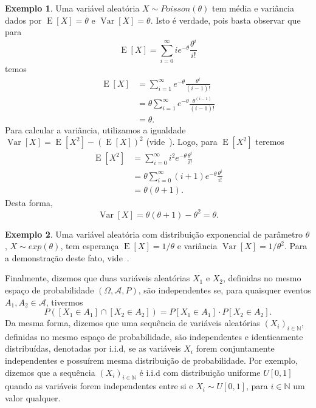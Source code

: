 \documentclass[twoside,openright,titlepage,numbers=noenddot,headinclude,  lineheaders footinclude=true,cleardoublepage=empty,
                                BCOR=5mm,paper=a4,fontsize=12pt ]{scrbook}
\theoremstyle{definition}
\newtheorem{exmp}{Exemplo}[section]
\DeclareMathOperator{\E}{E}
\DeclareMathOperator{\Var}{Var}
\begin{document}
\begin{exmp}
Uma variável aleatória $X \sim Poisson(\theta)$ tem média e variância dados por
$\E[X] = \theta$  e $\Var[X] = \theta$. Isto é verdade, pois
basta observar que para
\[
\E[X] = \sum_{i=0}^{\infty} i e^{-\theta} \frac{\theta^i}{i!}
\]
temos 
\begin{align*}
\E[X] &= \sum_{i=1}^{\infty} e^{-\theta} \frac{\theta^i}{(i-1)!}\\
     &= \theta \sum_{i=1}^{\infty} e^{-\theta} \frac{\theta^{(i-1)}}{(i-1)!}\\
	 &= \theta.
\end{align*}
Para calcular a variância, utilizamos a igualdade $\Var[X] = \E[X^2] - ( \E[X] )^2$ (vide~\cite{barry}).
Logo, para $\E[X^2]$ teremos
\begin{align*}
\E[X^2] &= \sum_{i=0}^{\infty} i^2 e^{-\theta} \frac{\theta^i}{i!}\\
       &= \theta \sum_{i=0}^{\infty}(i+1) e^{-\theta} \frac{\theta^{i}}{i!}\\
	   &= \theta (\theta + 1).
\end{align*}
Desta forma,
\[
\Var[X] = \theta ( \theta +1) - \theta^2 = \theta.
\]
\end{exmp}

\begin{exmp}
Uma variável aleatória com distribuição exponencial de parâmetro $\theta$, $X \sim exp(\theta)$,
tem esperança $\E[X] = 1/\theta$ e variância $\Var[X] = 1/\theta^2$. Para a 
demonstração deste fato,  vide~\cite{barry}.
\end{exmp}

Finalmente, dizemos que duas variáveis aleatórias $X_1$ e $X_2$, definidas no mesmo espaço de probabilidade
$(\Omega, \mathscr{A}, P)$, são independentes se, para quaisquer eventos $A_1, A_2 \in \mathscr{A}$,
tivermos
\[
P( [X_1 \in A_1] \cap [X_2 \in A_2] ) = 
P[X_1 \in A_1] \cdot P[X_2 \in A_2].
\]
Da mesma forma, dizemos que uma sequência de variáveis aleatórias $(X_i)_{i \in \mathbb{N}}$, definidas no mesmo espaço
de probabilidade,
são independentes e identicamente distribuídas, denotadas por i.i.d, se as variáveis $X_i$
forem conjuntamente independentes e possuírem mesma distribuição de probabilidade. Por exemplo, dizemos que a sequência
$(X_i)_{i \in \mathbb{N}}$ é i.i.d com distribuição uniforme $U[0,1]$ quando as variáveis forem
independentes entre si e $X_i \sim U[0,1]$, para $i \in \mathbb{N}$ um valor qualquer.
\end{document}
